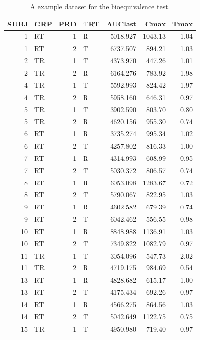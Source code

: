 \documentclass[
  10pt,
]{krantz}
\begin{document}
\begin{table}

\caption{\label{tab:beconcdata}A example dataset for the bioequivalence test.}
\centering
\begin{tabular}[t]{r|l|r|l|r|r|r}
\hline
SUBJ & GRP & PRD & TRT & AUClast & Cmax & Tmax\\
\hline
1 & RT & 1 & R & 5018.927 & 1043.13 & 1.04\\
\hline
1 & RT & 2 & T & 6737.507 & 894.21 & 1.03\\
\hline
2 & TR & 1 & T & 4373.970 & 447.26 & 1.01\\
\hline
2 & TR & 2 & R & 6164.276 & 783.92 & 1.98\\
\hline
4 & TR & 1 & T & 5592.993 & 824.42 & 1.97\\
\hline
4 & TR & 2 & R & 5958.160 & 646.31 & 0.97\\
\hline
5 & TR & 1 & T & 3902.590 & 803.70 & 0.80\\
\hline
5 & TR & 2 & R & 4620.156 & 955.30 & 0.74\\
\hline
6 & RT & 1 & R & 3735.274 & 995.34 & 1.02\\
\hline
6 & RT & 2 & T & 4257.802 & 816.33 & 1.00\\
\hline
7 & RT & 1 & R & 4314.993 & 608.99 & 0.95\\
\hline
7 & RT & 2 & T & 5030.372 & 806.57 & 0.74\\
\hline
8 & RT & 1 & R & 6053.098 & 1283.67 & 0.72\\
\hline
8 & RT & 2 & T & 5790.067 & 822.95 & 1.03\\
\hline
9 & RT & 1 & R & 4602.582 & 679.39 & 0.74\\
\hline
9 & RT & 2 & T & 6042.462 & 556.55 & 0.98\\
\hline
10 & RT & 1 & R & 8848.988 & 1136.91 & 1.03\\
\hline
10 & RT & 2 & T & 7349.822 & 1082.79 & 0.97\\
\hline
11 & TR & 1 & T & 3054.096 & 547.73 & 2.02\\
\hline
11 & TR & 2 & R & 4719.175 & 984.69 & 0.54\\
\hline
13 & RT & 1 & R & 4828.682 & 615.17 & 1.00\\
\hline
13 & RT & 2 & T & 4175.434 & 692.26 & 0.97\\
\hline
14 & RT & 1 & R & 4566.275 & 864.56 & 1.03\\
\hline
14 & RT & 2 & T & 5042.649 & 1122.75 & 0.75\\
\hline
15 & TR & 1 & T & 4950.980 & 719.40 & 0.97\\

\end{tabular}
\end{table}
\end{document}
